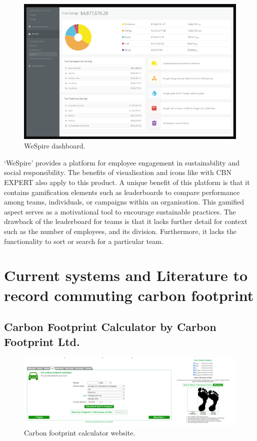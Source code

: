 \documentclass{l4proj}
\begin{document}
\begin{figure}[ht]
  \centering
  \includegraphics[width=0.75\linewidth]{images/WeSpire.png}
  \caption{WeSpire dashboard.}
  \label{fig:wespire}
\end{figure}
 
‘WeSpire’ provides a platform for employee engagement in sustainability and social responsibility. The benefits of visualisation and icons like with CBN EXPERT also apply to this product. A unique benefit of this platform is that it contains gamification elements such as leaderboards to compare performance among teams, individuals, or campaigns within an organisation. This gamified aspect serves as a motivational tool to encourage sustainable practices. The drawback of the leaderboard for teams is that it lacks further detail for context such as the number of employees, and its division. Furthermore, it lacks the functionality to sort or search for a particular team. 

\section{Current systems and Literature to record commuting carbon footprint}

\subsection{Carbon Footprint Calculator by Carbon Footprint Ltd.}

\begin{figure}[ht]
  \centering
  \includegraphics[width=\linewidth]{images/carbon footprint calculator.png}
  \caption{Carbon footprint calculator website.}
  \label{fig:carbonfootprintcalculator}
\end{figure}
   
\end{document}
